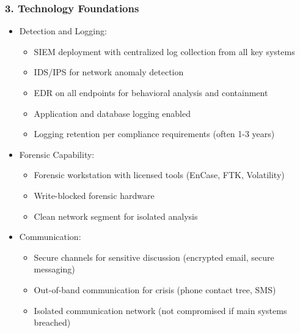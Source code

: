 \documentclass[10pt]{article}
\begin{document}
\subsubsection*{3. Technology Foundations}
\begin{itemize}
  \item Detection and Logging:
  \begin{itemize}
  	\item SIEM deployment with centralized log collection from all key systems
  	\item IDS/IPS for network anomaly detection
  	\item EDR on all endpoints for behavioral analysis and containment
  	\item Application and database logging enabled
  	\item Logging retention per compliance requirements (often 1-3 years)
  \end{itemize}
  \item Forensic Capability:
  \begin{itemize}
  	\item Forensic workstation with licensed tools (EnCase, FTK, Volatility)
  	\item Write-blocked forensic hardware
  	\item Clean network segment for isolated analysis
  \end{itemize}
  \item Communication:
  \begin{itemize}
  	\item Secure channels for sensitive discussion (encrypted email, secure messaging)
  	\item Out-of-band communication for crisis (phone contact tree, SMS)
  	\item Isolated communication network (not compromised if main systems breached)
  \end{itemize}
\end{itemize}
\end{document}

